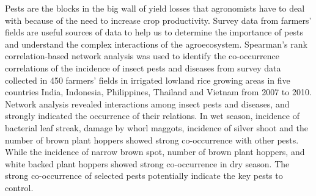 \documentclass[12pt,a4paper]{article}
\begin{document}
Pests are the blocks in the big wall of yield losses that agronomists have to deal with because of the need to increase crop productivity. Survey data from farmers' fields are useful sources of data to help us to determine the importance of pests and understand the complex interactions of the agroecosystem. Spearman's rank correlation-based network analysis was used to identify the co-occurrence correlations of the incidence of insect pests and diseases from survey data collected in 450 farmers' fields in irrigated lowland rice growing areas in five countries India, Indonesia, Philippines, Thailand and Vietnam from 2007 to 2010. Network analysis revealed interactions among insect pests and diseases, and strongly indicated the occurrence of their relations. In wet season, incidence of bacterial leaf streak, damage by whorl maggots, incidence of silver shoot and the number of brown plant hoppers showed strong co-occurrence with other pests. While the incidence of narrow brown spot, number of brown plant hoppers, and white backed plant hoppers showed strong co-occurrence in dry season. The strong co-occurrence of selected pests potentially indicate the key pests to control. 
\end{document}
